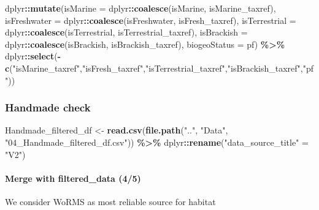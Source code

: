 \documentclass[
]{article}
\newenvironment{Shaded}{\begin{snugshade}}{\end{snugshade}}
\newcommand{\AttributeTok}[1]{\textcolor[rgb]{0.13,0.29,0.53}{#1}}
\newcommand{\FunctionTok}[1]{\textcolor[rgb]{0.13,0.29,0.53}{\textbf{#1}}}
\newcommand{\NormalTok}[1]{#1}
\newcommand{\OtherTok}[1]{\textcolor[rgb]{0.56,0.35,0.01}{#1}}
\newcommand{\SpecialCharTok}[1]{\textcolor[rgb]{0.81,0.36,0.00}{\textbf{#1}}}
\newcommand{\StringTok}[1]{\textcolor[rgb]{0.31,0.60,0.02}{#1}}
\begin{document}
\begin{Shaded}
\begin{Highlighting}[]
\NormalTok{  dplyr}\SpecialCharTok{::}\FunctionTok{mutate}\NormalTok{(}\AttributeTok{isMarine =}\NormalTok{ dplyr}\SpecialCharTok{::}\FunctionTok{coalesce}\NormalTok{(isMarine, isMarine\_taxref),}
                \AttributeTok{isFreshwater =}\NormalTok{ dplyr}\SpecialCharTok{::}\FunctionTok{coalesce}\NormalTok{(isFreshwater, isFresh\_taxref),}
                \AttributeTok{isTerrestrial =}\NormalTok{ dplyr}\SpecialCharTok{::}\FunctionTok{coalesce}\NormalTok{(isTerrestrial, isTerrestrial\_taxref),}
                \AttributeTok{isBrackish =}\NormalTok{ dplyr}\SpecialCharTok{::}\FunctionTok{coalesce}\NormalTok{(isBrackish, isBrackish\_taxref),}
                \AttributeTok{biogeoStatus =}\NormalTok{ pf) }\SpecialCharTok{\%\textgreater{}\%}
\NormalTok{  dplyr}\SpecialCharTok{::}\FunctionTok{select}\NormalTok{(}\SpecialCharTok{{-}}\FunctionTok{c}\NormalTok{(}\StringTok{"isMarine\_taxref"}\NormalTok{,}\StringTok{"isFresh\_taxref"}\NormalTok{,}\StringTok{"isTerrestrial\_taxref"}\NormalTok{,}\StringTok{"isBrackish\_taxref"}\NormalTok{,}\StringTok{"pf"}\NormalTok{))}
\end{Highlighting}
\end{Shaded}

\hypertarget{handmade-check}{%
\subsubsection{Handmade check}\label{handmade-check}}

\begin{Shaded}
\begin{Highlighting}[]
\NormalTok{Handmade\_filtered\_df }\OtherTok{\textless{}{-}} \FunctionTok{read.csv}\NormalTok{(}\FunctionTok{file.path}\NormalTok{(}\StringTok{".."}\NormalTok{, }\StringTok{"Data"}\NormalTok{, }\StringTok{"04\_Handmade\_filtered\_df.csv"}\NormalTok{)) }\SpecialCharTok{\%\textgreater{}\%}
\NormalTok{  dplyr}\SpecialCharTok{::}\FunctionTok{rename}\NormalTok{(}\StringTok{"data\_source\_title"} \OtherTok{=} \StringTok{"V2"}\NormalTok{)}
\end{Highlighting}
\end{Shaded}

\hypertarget{merge-with-filtered_data-45}{%
\paragraph{Merge with filtered\_data
(4/5)}\label{merge-with-filtered_data-45}}

We consider WoRMS as most reliable source for habitat
\end{document}
